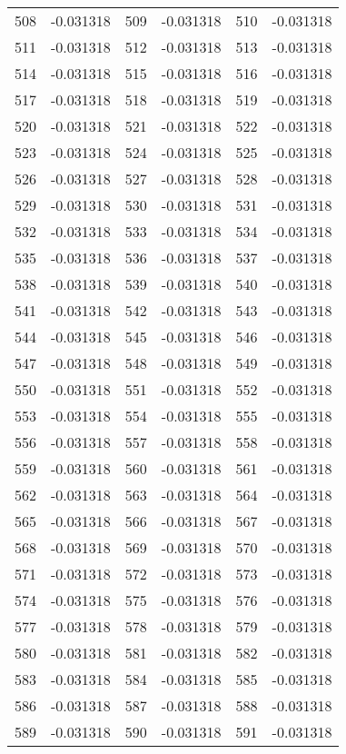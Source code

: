 \documentclass[12pt]{article}
\begin{document}
\begin{longtable}{@{}cc|cc|cc@{}}
508 & -0.031318 & 509 & -0.031318 & 510 & -0.031318 \\
511 & -0.031318 & 512 & -0.031318 & 513 & -0.031318 \\
514 & -0.031318 & 515 & -0.031318 & 516 & -0.031318 \\
517 & -0.031318 & 518 & -0.031318 & 519 & -0.031318 \\
520 & -0.031318 & 521 & -0.031318 & 522 & -0.031318 \\
523 & -0.031318 & 524 & -0.031318 & 525 & -0.031318 \\
526 & -0.031318 & 527 & -0.031318 & 528 & -0.031318 \\
529 & -0.031318 & 530 & -0.031318 & 531 & -0.031318 \\
532 & -0.031318 & 533 & -0.031318 & 534 & -0.031318 \\
535 & -0.031318 & 536 & -0.031318 & 537 & -0.031318 \\
538 & -0.031318 & 539 & -0.031318 & 540 & -0.031318 \\
541 & -0.031318 & 542 & -0.031318 & 543 & -0.031318 \\
544 & -0.031318 & 545 & -0.031318 & 546 & -0.031318 \\
547 & -0.031318 & 548 & -0.031318 & 549 & -0.031318 \\
550 & -0.031318 & 551 & -0.031318 & 552 & -0.031318 \\
553 & -0.031318 & 554 & -0.031318 & 555 & -0.031318 \\
556 & -0.031318 & 557 & -0.031318 & 558 & -0.031318 \\
559 & -0.031318 & 560 & -0.031318 & 561 & -0.031318 \\
562 & -0.031318 & 563 & -0.031318 & 564 & -0.031318 \\
565 & -0.031318 & 566 & -0.031318 & 567 & -0.031318 \\
568 & -0.031318 & 569 & -0.031318 & 570 & -0.031318 \\
571 & -0.031318 & 572 & -0.031318 & 573 & -0.031318 \\
574 & -0.031318 & 575 & -0.031318 & 576 & -0.031318 \\
577 & -0.031318 & 578 & -0.031318 & 579 & -0.031318 \\
580 & -0.031318 & 581 & -0.031318 & 582 & -0.031318 \\
583 & -0.031318 & 584 & -0.031318 & 585 & -0.031318 \\
586 & -0.031318 & 587 & -0.031318 & 588 & -0.031318 \\
589 & -0.031318 & 590 & -0.031318 & 591 & -0.031318 \\

\end{longtable}
\end{document}
